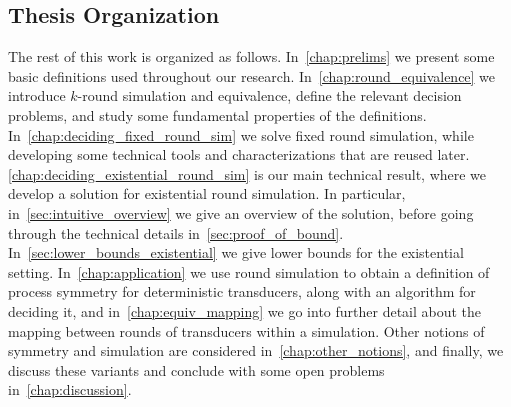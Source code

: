 \subsection*{Thesis Organization}
The rest of this work is organized as follows.
In~\cref{chap:prelims} we present some basic definitions used throughout our research. In~\cref{chap:round_equivalence} we introduce $k$-round simulation and equivalence, define the relevant decision problems, and study some fundamental properties of the definitions. In~\cref{chap:deciding_fixed_round_sim} we solve fixed round simulation, while developing some technical tools and characterizations that are reused later. \cref{chap:deciding_existential_round_sim} is our main technical result, where we develop a solution for existential round simulation. In particular, in~\cref{sec:intuitive_overview} we give an overview of the solution, before going through the technical details in~\cref{sec:proof_of_bound}. In~\cref{sec:lower_bounds_existential} we give lower bounds for the existential setting.
In~\cref{chap:application} we use round simulation to obtain a definition of process symmetry for deterministic transducers, along with an algorithm for deciding it, and in~\cref{chap:equiv_mapping} we go into further detail about the mapping between rounds of transducers within a simulation. Other notions of symmetry and simulation are considered in~\cref{chap:other_notions}, and finally, we discuss these variants and conclude with some open problems in~\cref{chap:discussion}.
